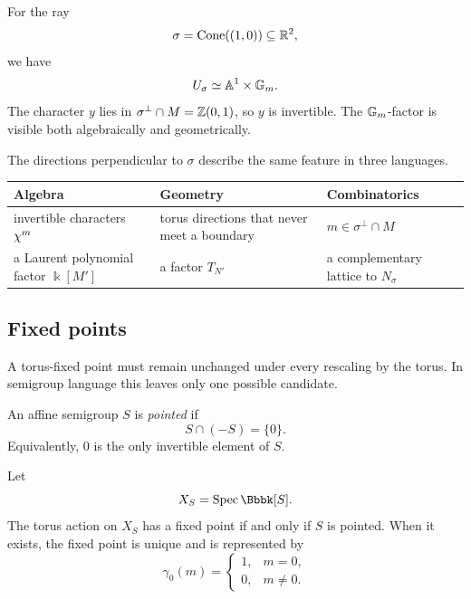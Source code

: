 \begin{example}
For the ray
\[
\sigma=\operatorname{Cone}((1,0))\subseteq\mathbb{R}^2,
\]
we have
\[
U_\sigma\simeq\mathbb{A}^1\times\mathbb{G}_{m}.
\]
The character \(y\) lies in
\(\sigma^\perp\cap M=\mathbb{Z}(0,1)\), so \(y\) is invertible. The
\(\mathbb{G}_{m}\)-factor is visible both algebraically and geometrically.
\end{example}

\begin{threedictionaries}
The directions perpendicular to \(\sigma\) describe the same feature
in three languages.

\medskip

\begin{center}
\small
\begin{tabularx}{\linewidth}{@{}
  >{\raggedright\arraybackslash}X
  >{\raggedright\arraybackslash}X
  >{\raggedright\arraybackslash}X@{}}
\toprule
\textbf{Algebra}
&
\textbf{Geometry}
&
\textbf{Combinatorics}
\\
\midrule
invertible characters
\(\chi^{m}\)
&
torus directions that never meet a boundary
&
\(m\in\sigma^\perp\cap M\)
\\[1mm]
a Laurent polynomial factor
\(\Bbbk[M']\)
&
a factor \(T_{N'}\)
&
a complementary lattice to
\(N_\sigma\)
\\
\bottomrule
\end{tabularx}
\end{center}
\end{threedictionaries}

\subsection{Fixed points}

A torus-fixed point must remain unchanged under every rescaling by
the torus. In semigroup language this leaves only one possible
candidate.

\begin{definition}
An affine semigroup \(S\) is \emph{pointed} if
\[
S\cap(-S)=\{0\}.
\]
Equivalently, \(0\) is the only invertible element of \(S\).
\end{definition}

\begin{proposition}
\label{prop:fixed-points-affine-toric}
Let
\[
X_S=\Spec\Bbbk[S].
\]
The torus action on \(X_S\) has a fixed point if and only if \(S\) is
pointed. When it exists, the fixed point is unique and is represented
by
\[
\gamma_0(m)
=
\begin{cases}
1,&m=0,\\
0,&m\neq0.
\end{cases}
\]
\end{proposition}

